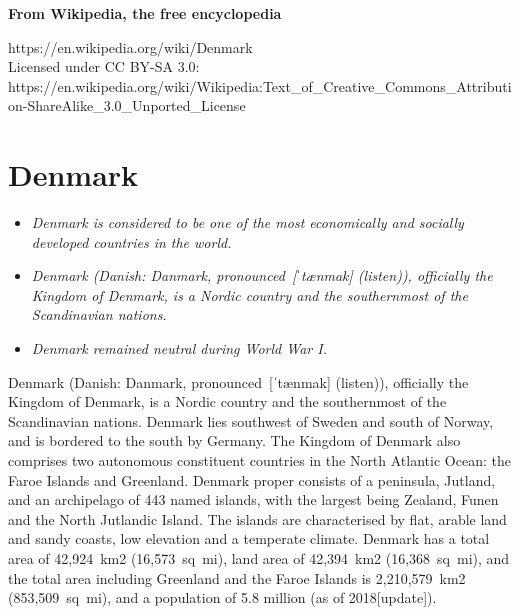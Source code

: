 \textbf{From Wikipedia, the free encyclopedia}

https://en.wikipedia.org/wiki/Denmark\\
Licensed under CC BY-SA 3.0:\\
https://en.wikipedia.org/wiki/Wikipedia:Text\_of\_Creative\_Commons\_Attribution-ShareAlike\_3.0\_Unported\_License

\section{Denmark}\label{denmark}

\begin{itemize}
\item
  \emph{Denmark is considered to be one of the most economically and
  socially developed countries in the world.}
\item
  \emph{Denmark (Danish: Danmark, pronounced~{[}ˈtænmak{]} (listen)),
  officially the Kingdom of Denmark, is a Nordic country and the
  southernmost of the Scandinavian nations.}
\item
  \emph{Denmark remained neutral during World War I.}
\end{itemize}

Denmark (Danish: Danmark, pronounced~{[}ˈtænmak{]} (listen)), officially
the Kingdom of Denmark, is a Nordic country and the southernmost of the
Scandinavian nations. Denmark lies southwest of Sweden and south of
Norway, and is bordered to the south by Germany. The Kingdom of Denmark
also comprises two autonomous constituent countries in the North
Atlantic Ocean: the Faroe Islands and Greenland. Denmark proper consists
of a peninsula, Jutland, and an archipelago of 443 named islands, with
the largest being Zealand, Funen and the North Jutlandic Island. The
islands are characterised by flat, arable land and sandy coasts, low
elevation and a temperate climate. Denmark has a total area of
42,924~km2 (16,573~sq~mi), land area of 42,394~km2 (16,368~sq~mi), and
the total area including Greenland and the Faroe Islands is
2,210,579~km2 (853,509~sq~mi), and a population of 5.8 million (as of
2018{[}update{]}).

